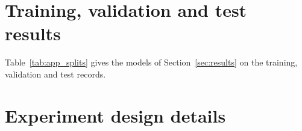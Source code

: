 
\section{Training, validation and test results}\label{app:splits}
Table~\ref{tab:app_splits} gives the models of Section~\ref{sec:results} on
the training, validation and test records.
\begin{table}[t]
  \centering
  \caption{$\mathrm{NRMS}_e$ per axis on the training, validation and test records, mean over the records of each set with and without multisine.}
  \label{tab:app_splits}
  
\end{table}


\section{Experiment design details}\label{app:setup}
%

